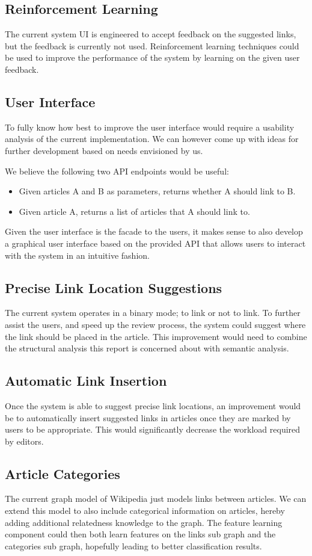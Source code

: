 \subsection{Reinforcement Learning}
The current system UI is engineered to accept feedback on the suggested links, but the feedback is currently not used. Reinforcement learning techniques could be used to improve the performance of the system by learning on the given user feedback.

\subsection{User Interface}
To fully know how best to improve the user interface would require a usability analysis of the current implementation. We can however come up with ideas for further development based on needs envisioned by us.

We believe the following two API endpoints would be useful:
\begin{itemize}
    \item Given articles A and B as parameters, returns whether A should link to B.
    \item Given article A, returns a list of articles that A should link to.
\end{itemize}

Given the user interface is the facade to the users, it makes sense to also develop a graphical user interface based on the provided API that allows users to interact with the system in an intuitive fashion.

\subsection{Precise Link Location Suggestions}
The current system operates in a binary mode; to link or not to link. To further assist the users, and speed up the review process, the system could suggest where the link should be placed in the article. This improvement would need to combine the structural analysis this report is concerned about with semantic analysis.

\subsection{Automatic Link Insertion}
Once the system is able to suggest precise link locations, an improvement would be to automatically insert suggested links in articles once they are marked by users to be appropriate. This would significantly decrease the workload required by editors.

\subsection{Article Categories}
The current graph model of Wikipedia just models links between articles. We can extend this model to also include categorical information on articles, hereby adding additional relatedness knowledge to the graph. The feature learning component could then both learn features on the links sub graph and the categories sub graph, hopefully leading to better classification results.